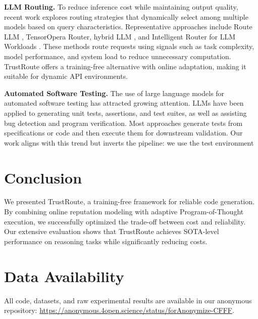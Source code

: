 \documentclass[acmsmall,screen,review,anonymous]{acmart}
\begin{document}
\textbf{LLM Routing.} To reduce inference cost while maintaining output quality, recent work explores routing strategies that dynamically select among multiple models based on query characteristics. Representative approaches include Route LLM \cite{ong2024routellm}, TensorOpera \cite{stripelis2024tensoropera} Router, hybrid LLM \cite{ding2024hybrid}, and Intelligent Router for LLM Workloads \cite{jain2024intelligent}. These methods route requests using signals such as task complexity, model performance, and system load to reduce unnecessary computation. TrustRoute offers a training-free alternative with online adaptation, making it suitable for dynamic API environments.

\textbf{Automated Software Testing.} The use of large language models for automated software testing has attracted growing attention\cite{wang2023software}. LLMs have been applied to generating unit tests, assertions, and test suites\cite{schafer2023empirical}, as well as assisting bug detection and program verification. Most approaches generate tests from specifications or code and then execute them for downstream validation\cite{chen2023teaching,ni2023lever}. Our work aligns with this trend but inverts the pipeline: we use the test environment


\section{Conclusion}

We presented TrustRoute, a training-free framework for reliable code generation. By combining online reputation modeling with adaptive Program-of-Thought execution, we successfully optimized the trade-off between cost and reliability. Our extensive evaluation shows that TrustRoute achieves SOTA-level performance on reasoning tasks while significantly reducing costs.



\section*{Data Availability}
All code, datasets, and raw experimental results are available in our anonymous repository: \url{https://anonymous.4open.science/status/forAnonymize-CFFF}.



\end{document}
